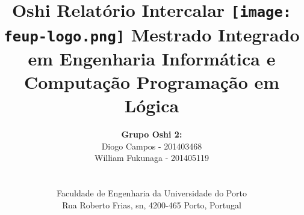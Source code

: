 \documentclass[a4paper]{article}
\begin{document}
\setlength{\textwidth}{16cm}
\setlength{\textheight}{22cm}

\title{\Huge\textbf{Oshi}\linebreak\linebreak\linebreak
\Large\textbf{Relatório Intercalar}\linebreak\linebreak
\linebreak\linebreak
\texttt{[image: feup-logo.png]}\linebreak\linebreak
\linebreak\linebreak
\Large{Mestrado Integrado em Engenharia Informática e Computação} \linebreak\linebreak
\Large{Programação em Lógica}\linebreak
}

\author{\textbf{Grupo Oshi 2:}\\
Diogo Campos - 201403468 \\
William Fukunaga - 201405119 \\
\linebreak\linebreak \\
 \\ Faculdade de Engenharia da Universidade do Porto \\ Rua Roberto Frias, s\/n, 4200-465 Porto, Portugal \linebreak\linebreak\linebreak
\linebreak\linebreak\vspace{1cm}}

\maketitle
\thispagestyle{empty}


\newpage
\end{document}

